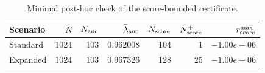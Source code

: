 \begin{table}[t]
\centering
\caption{Minimal post-hoc check of the score-bounded certificate.}
\label{tab:minimal_score_hull_check}
\footnotesize
\setlength{\tabcolsep}{4pt}
\begin{tabular}{lrrrrrr}
\toprule
Scenario & $N$ & $N_{\rm anc}$ & $\bar\lambda_{\rm anc}$ & $N_{\rm score}$ & $N_{\rm score}^{+}$ & $r_{\rm score}^{\max}$ \\
\midrule
Standard & 1024 & 103 & 0.962008 & 104 & 1 & $-1.00e-06$ \\
Expanded & 1024 & 103 & 0.967326 & 128 & 25 & $-1.00e-06$ \\
\bottomrule
\end{tabular}
\end{table}
